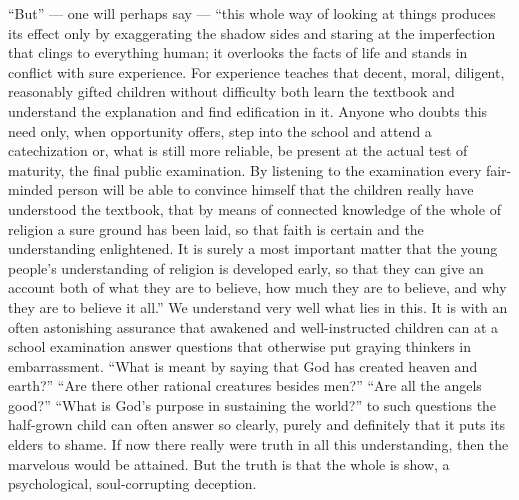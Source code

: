 \documentclass[12pt,a4paper,openany]{book}
\newcommand{\opage}[1]{\marginnote{\footnotesize\textit{[#1]}}}
\begin{document}
``But'' --- one will perhaps say --- ``this whole way of looking at things
produces its effect only by exaggerating
the shadow sides and staring at the imperfection
that clings to everything human; it overlooks the facts of
life and stands in conflict with sure experience.
For experience teaches that decent, moral, diligent,
reasonably gifted children without difficulty both learn
the textbook and understand the explanation and find edification
in it. Anyone who doubts this need only, when opportunity
offers, step into the school and attend a
catechization or, what is still more reliable, be
present at the actual test of maturity, the final
public examination. By listening to the examination every
fair-minded person will be able to convince himself that the children
really have understood the textbook, that by means of connected
knowledge of the whole of religion a
\setcounter{footnote}{0}%
\opage{316}sure ground has been laid, so that faith is certain and the understanding enlightened.
It is surely a most important matter that the young people's understanding
of religion is developed early, so that they can give
an account both of what they are to believe, how much they
are to believe, and why they are to believe it all.''
We understand very well what lies in this. It is with
an often astonishing assurance that awakened and well-instructed
children can at a school examination answer questions
that otherwise put graying thinkers in embarrassment.
``What is meant by saying that God has created heaven and earth?''
``Are there other rational creatures besides men?''
``Are all the angels good?'' ``What is God's
purpose in sustaining the world?'' to such questions
the half-grown child can often answer so clearly, purely and
definitely that it puts its elders to shame. If now
there really were truth in all this understanding, then
the marvelous would be attained. But the truth is that the whole
is show, a psychological, soul-corrupting deception.
\end{document}
